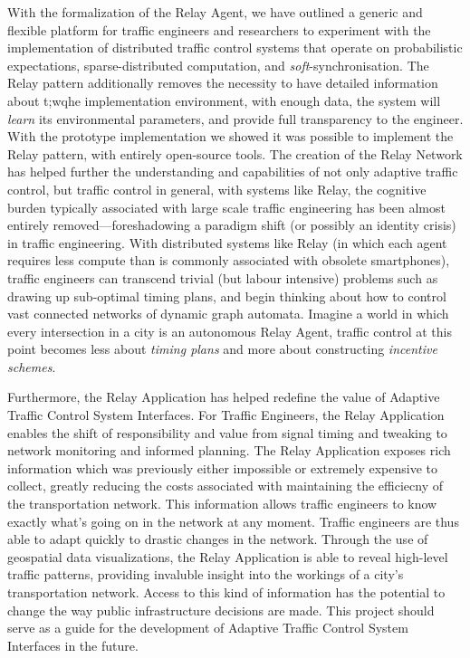 \documentclass{report}
\begin{document}
With the formalization of the Relay Agent, we have outlined a generic and flexible platform for traffic engineers and researchers to experiment with the implementation of distributed traffic control systems that operate on probabilistic expectations, sparse-distributed computation, and \emph{soft}-synchronisation.
The Relay pattern additionally removes the necessity to have detailed information about t;wqhe implementation environment, with enough data, the system will \emph{learn} its environmental parameters, and provide full transparency to the engineer.
With the prototype implementation we showed it was possible to implement the Relay pattern, with entirely open-source tools.
The creation of the Relay Network  has helped further the understanding and capabilities of not only adaptive traffic control, but traffic control in general, with systems like Relay, the cognitive burden typically associated with large scale traffic engineering has been almost entirely removed---foreshadowing a paradigm shift (or possibly an identity crisis) in traffic engineering.
With distributed systems like Relay (in which each agent requires less compute than is commonly associated with obsolete smartphones), traffic engineers can transcend trivial (but labour intensive) problems such as drawing up sub-optimal timing plans, and begin thinking about how to control vast connected networks of dynamic graph automata.
Imagine a world in which every intersection in a city is an autonomous Relay Agent, traffic control at this point becomes less about \emph{timing plans} and more about constructing \emph{incentive schemes}.

Furthermore, the Relay Application has helped redefine the value of Adaptive Traffic Control System Interfaces. 
For Traffic Engineers, the Relay Application enables the shift of responsibility and value from signal timing and tweaking to network monitoring and informed planning. 
The Relay Application exposes rich information which was previously either impossible or extremely expensive to collect, greatly reducing the costs associated with maintaining the efficiecny of the transportation network. 
This information allows traffic engineers to know exactly what's going on in the network at any moment. Traffic engineers are thus able to adapt quickly to drastic changes in the network. 
Through the use of geospatial data visualizations, the Relay Application is able to reveal high-level traffic patterns, providing invaluble insight into the workings of a city's transportation network. 
Access to this kind of information has the potential to change the way public infrastructure decisions are made. 
This project should serve as a guide for the development of Adaptive Traffic Control System Interfaces in the future.
\end{document}

